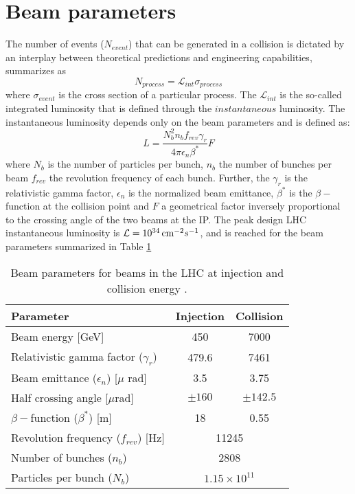 \section{Beam parameters}
\noindent\justify
The number of events ($N_{event}$) that can be generated in a collision is dictated by an interplay between theoretical predictions and engineering capabilities, summarizes as
\begin{equation}
N_{process}=\mathcal{L}_{int}\sigma_{process}
\label{eq:nevents}
\end{equation}
where $\sigma_{event}$ is the cross section of a particular process. 
The $\mathcal{L}_{int}$ is the so-called integrated luminosity that is defined through the $instantaneous$ luminosity. 
The instantaneous luminosity depends only on the beam parameters and is defined as:
\begin{equation}
L=\frac{N_{b}^{2}n_{b}f_{rev}\gamma_{r}}{4\pi\epsilon_{n}\beta^{*}}F
\end{equation}
where $N_{b}$ is the number of particles per bunch, $n_{b}$ the number of bunches per beam $f_{rev}$ the revolution frequency of each bunch. 
Further, the $\gamma_{r}$ is the relativistic gamma factor, $\epsilon_{n}$ is the normalized beam emittance, $\beta^{*}$ is the $\beta-$function at the collision point and $F$ a geometrical factor inversely proportional to the crossing angle of the two beams at the IP.  
The peak design LHC instantaneous luminosity is $\mathcal{L}=10^{34}\,\text{cm}^{-2}s^{-1}$, and is reached for the beam parameters summarized in Table \ref{tab:beam}
\begin{table}[ht!]
\def\arraystretch{1.2}
    \caption{Beam parameters for beams in the LHC at injection and collision energy \cite{Brüning:782076}.}
    \begin{center}
        \begin{tabular}{ l c c }
        \hline \hline
        Parameter &  Injection &  Collision  \\\hline
        Beam energy [GeV] & 450  & 7000      \\
        Relativistic gamma factor ($\gamma_{r}$)  & 479.6  & 7461     \\
        Beam emittance  ($\epsilon_{n}$) [$\mu$ rad] &  3.5 &  3.75   \\
        Half crossing angle  [$\mu$rad] &  $\pm160$ &  $\pm142.5$   \\
        $\beta-$function ($\beta^{*}$) [m] &  18 &  0.55   \\
        Revolution frequency ($f_{rev}$) [Hz] & \multicolumn{2}{c}{11245}\\
        Number of bunches ($n_{b}$) & \multicolumn{2}{c}{2808}\\
        Particles per bunch ($N_{b}$) & \multicolumn{2}{c}{$1.15\times10^{11}$}\\
\hline\hline
\end{tabular}
\end{center}
\label{tab:beam}
\end{table}
